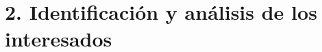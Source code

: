 \documentclass[
11pt, %
]{charter}
\begin{document}







\section{2. Identificación y análisis de los interesados}
\label{sec:interesados}

 
\end{document}
